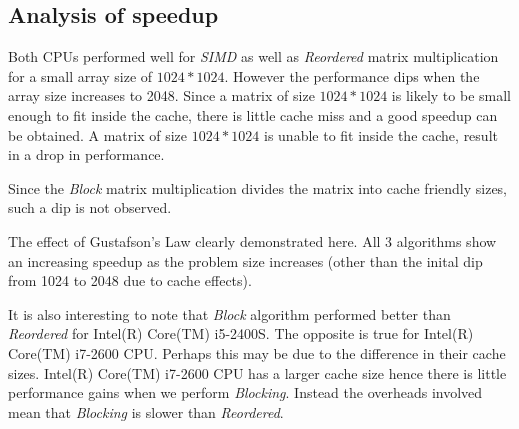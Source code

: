 \documentclass{article}
\begin{document}
\subsection{Analysis of speedup}

Both CPUs performed well for \textit{SIMD} as well as \textit{Reordered} matrix multiplication for a small array size of \begin{math}1024*1024\end{math}. However the performance dips when the array size increases to 2048. Since a matrix of size \begin{math}1024*1024\end{math} is likely to be small enough to fit inside the cache, there is little cache miss and a good speedup can be obtained. A matrix of size \begin{math}1024*1024\end{math} is unable to fit inside the cache, result in a drop in performance.

Since the \textit{Block} matrix multiplication divides the matrix into cache friendly sizes, such a dip is not observed.

The effect of Gustafson's Law clearly demonstrated here. All 3 algorithms show an increasing speedup as the problem size increases (other than the inital dip from 1024 to 2048 due to cache effects). 

It is also interesting to note that \textit{Block} algorithm performed better than \textit{Reordered} for 
Intel(R) Core(TM) i5-2400S. The opposite is true for Intel(R) Core(TM) i7-2600 CPU. Perhaps this may be due to the difference in their cache sizes. Intel(R) Core(TM) i7-2600 CPU has a larger cache size hence there is little performance gains when we perform \textit{Blocking}. Instead the overheads involved mean that \textit{Blocking} is slower than \textit{Reordered}.
\end{document}
